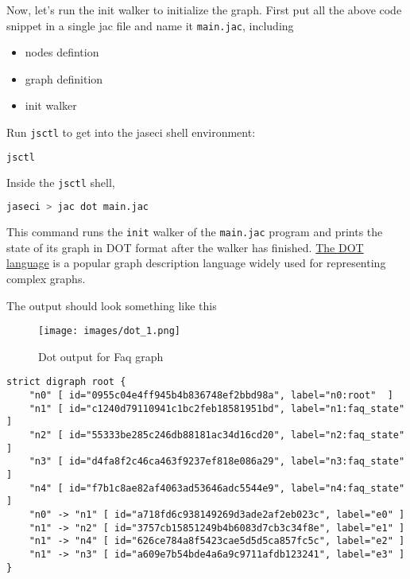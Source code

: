 Now, let's run the init walker to initialize the graph. First put all
the above code snippet in a single jac file and name it
\passthrough{\lstinline!main.jac!}, including

\begin{itemize}
\tightlist
\item
  nodes defintion
\item
  graph definition
\item
  init walker
\end{itemize}

Run \passthrough{\lstinline!jsctl!} to get into the jaseci shell
environment:

\begin{lstlisting}[language=bash]
jsctl
\end{lstlisting}

Inside the \passthrough{\lstinline!jsctl!} shell,

\begin{lstlisting}[language=bash]
jaseci > jac dot main.jac
\end{lstlisting}

This command runs the \passthrough{\lstinline!init!} walker of the
\passthrough{\lstinline!main.jac!} program and prints the state of its
graph in DOT format after the walker has finished.
\href{https://graphviz.org/doc/info/lang.html}{The DOT language} is a
popular graph description language widely used for representing complex
graphs.

The output should look something like this

\begin{figure}
\centering
\texttt{[image: images/dot\_1.png]}
\caption{Dot output for Faq graph}
\end{figure}

\begin{lstlisting}
strict digraph root {
    "n0" [ id="0955c04e4ff945b4b836748ef2bbd98a", label="n0:root"  ]
    "n1" [ id="c1240d79110941c1bc2feb18581951bd", label="n1:faq_state"  ]
    "n2" [ id="55333be285c246db88181ac34d16cd20", label="n2:faq_state"  ]
    "n3" [ id="d4fa8f2c46ca463f9237ef818e086a29", label="n3:faq_state"  ]
    "n4" [ id="f7b1c8ae82af4063ad53646adc5544e9", label="n4:faq_state"  ]
    "n0" -> "n1" [ id="a718fd6c938149269d3ade2af2eb023c", label="e0" ]
    "n1" -> "n2" [ id="3757cb15851249b4b6083d7cb3c34f8e", label="e1" ]
    "n1" -> "n4" [ id="626ce784a8f5423cae5d5d5ca857fc5c", label="e2" ]
    "n1" -> "n3" [ id="a609e7b54bde4a6a9c9711afdb123241", label="e3" ]
}
\end{lstlisting}

